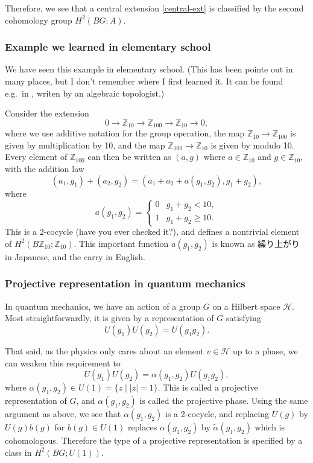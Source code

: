 \documentclass[12pt]{article}
\numberwithin{equation}{section}
\numberwithin{figure}{section}
\theoremstyle{remark}
\def\bZ{\mathbb{Z}}
\def\cH{\mathcal{H}}
\begin{document}
Therefore, we see that a central extension \eqref{central-ext}
is classified by the second cohomology group $H^2(BG;A)$.

\subsubsection{Example we learned in elementary school}
We have seen this example in elementary school.
(This has been pointe out in many places,
but I don't remember where I first learned it.
It can be found e.g.~in \cite{IsaksenElementary}, writen by an algebraic topologist.)


Consider the extension 
\begin{equation}
0\to \bZ_{10}\to \bZ_{100}\to \bZ_{10}\to 0,
\end{equation}
where we use additive notation for the group operation,
the map $\bZ_{10}\to \bZ_{100}$ is given by multiplication by 10,
and the map $\bZ_{100}\to \bZ_{10}$ is given by modulo 10.
Every element of $\bZ_{100}$ can then be written as $(a,g)$
where $a\in \bZ_{10}$ and $g\in \bZ_{10}$,
with the addition law \begin{equation}
(a_1,g_1)+(a_2,g_2)=(a_1+a_2+a(g_1, g_2),g_1+g_2),
\end{equation} where \begin{equation}
a(g_1,g_2)=\begin{cases}
0 & g_1+g_2<10,\\
1 & g_1+g_2\geq 10.
\end{cases}
\end{equation}
This is a 2-cocycle (have you ever checked it?), 
and defines a nontrivial element of $H^2(B\bZ_{10};\bZ_{10})$.
This important function $a(g_1,g_2)$ is known as 繰り上がり in Japanese,
and the carry in English.

\subsubsection{Projective representation in quantum mechanics}

In quantum mechanics, we have an action of a group $G$ 
on a Hilbert space $\cH$. 
Most straightforwardly, it is given by a representation of $G$
satisfying \begin{equation}
U(g_1) U(g_2) = U(g_1 g_2).
\end{equation}

That said, as the physics only cares about an element $v\in \cH$ up to a phase,
we can weaken this requirement to \begin{equation}
U(g_1) U(g_2) = \alpha(g_1,g_2) U(g_1 g_2),
\label{projective-rep}
\end{equation}
where $\alpha(g_1,g_2)\in U(1)=\{z \mid  |z|=1\}$.
This is called a projective representation of $G$,
and $\alpha(g_1,g_2)$ is called the projective phase.
Using the same argument as above, we see that $\alpha(g_1,g_2)$ is a 2-cocycle,
and replacing $U(g)$ by $U(g)b(g)$ for $b(g)\in U(1)$
replaces $\alpha(g_1,g_2)$ by $\tilde \alpha(g_1,g_2)$ which is cohomologous.
Therefore the type of a projective representation is specified by 
a class in $H^2(BG;U(1))$.
\end{document}
